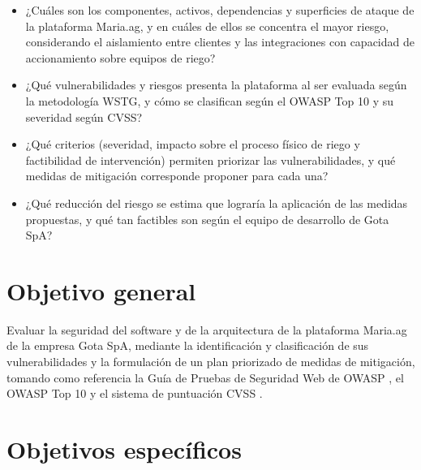 \documentclass[12pt,letterpaper]{report}
\begin{document}
\begin{itemize}[leftmargin=1.25cm]
    \item ¿Cuáles son los componentes, activos, dependencias y superficies de ataque de la plataforma Maria.ag, y en cuáles de ellos se concentra el mayor riesgo, considerando el aislamiento entre clientes y las integraciones con capacidad de accionamiento sobre equipos de riego?
    \item ¿Qué vulnerabilidades y riesgos presenta la plataforma al ser evaluada según la metodología WSTG, y cómo se clasifican según el OWASP Top 10 y su severidad según CVSS?
    \item ¿Qué criterios (severidad, impacto sobre el proceso físico de riego y factibilidad de intervención) permiten priorizar las vulnerabilidades, y qué medidas de mitigación corresponde proponer para cada una?
    \item ¿Qué reducción del riesgo se estima que lograría la aplicación de las medidas propuestas, y qué tan factibles son según el equipo de desarrollo de Gota SpA?
\end{itemize}

\newpage

\chapter*{Objetivo general}

Evaluar la seguridad del software y de la arquitectura de la plataforma Maria.ag de la empresa Gota SpA, mediante la identificación y clasificación de sus vulnerabilidades y la formulación de un plan priorizado de medidas de mitigación, tomando como referencia la Guía de Pruebas de Seguridad Web de OWASP \autocite{owasp2024wstg}, el OWASP Top 10 \autocite{owasp2025top10} y el sistema de puntuación CVSS \autocite{first2023cvss}.

\newpage

\chapter*{Objetivos específicos}
\end{document}
